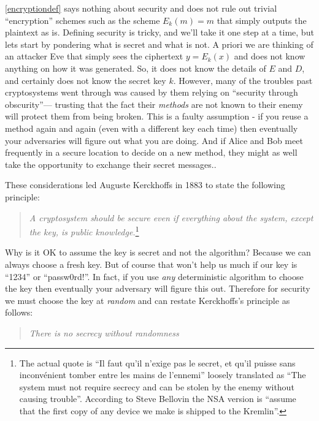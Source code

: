 \cref{encryptiondef} says nothing about security and does not rule out
trivial ``encryption'' schemes such as the scheme \(E_k(m) = m\) that
simply outputs the plaintext as is. Defining security is tricky, and
we'll take it one step at a time, but lets start by pondering what is
secret and what is not. A priori we are thinking of an attacker Eve that
simply sees the ciphertext \(y=E_k(x)\) and does not know anything on
how it was generated. So, it does not know the details of \(E\) and
\(D\), and certainly does not know the secret key \(k\). However, many
of the troubles past cryptosystems went through was caused by them
relying on ``security through obscurity''--- trusting that the fact
their \emph{methods} are not known to their enemy will protect them from
being broken. This is a faulty assumption - if you reuse a method again
and again (even with a different key each time) then eventually your
adversaries will figure out what you are doing. And if Alice and Bob
meet frequently in a secure location to decide on a new method, they
might as well take the opportunity to exchange their secret messages..

These considerations led Auguste Kerckhoffs in 1883 to state the
following principle:

\begin{quote}
\emph{A cryptosystem should be secure even if everything about the
system, except the key, is public knowledge.}\footnote{The actual quote
  is ``Il faut qu'il n'exige pas le secret, et qu'il puisse sans
  inconvénient tomber entre les mains de l'ennemi'' loosely translated
  as ``The system must not require secrecy and can be stolen by the
  enemy without causing trouble''. According to Steve Bellovin the NSA
  version is ``assume that the first copy of any device we make is
  shipped to the Kremlin''.}
\end{quote}

Why is it OK to assume the key is secret and not the algorithm? Because
we can always choose a fresh key. But of course that won't help us much
if our key is ``1234'' or ``passw0rd!''. In fact, if you use \emph{any}
deterministic algorithm to choose the key then eventually your adversary
will figure this out. Therefore for security we must choose the key at
\emph{random} and can restate Kerckhoffs's principle as follows:

\begin{quote}
\emph{There is no secrecy without randomness}
\end{quote}

